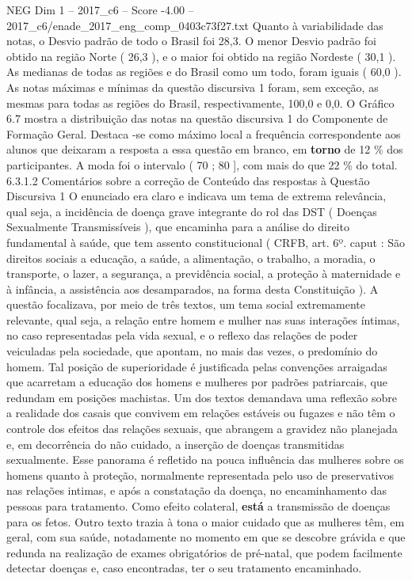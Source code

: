 \begin{textsample}{NEG Dim 1 – 2017\_c6 – Score -4.00 – 2017\_c6/enade\_2017\_eng\_comp\_0403c73f27.txt}
Quanto à variabilidade das notas, o Desvio padrão de todo o Brasil foi 28,3.
O menor Desvio padrão foi obtido na região Norte ( 26,3 ), e o maior foi obtido na região Nordeste ( 30,1 ).
As medianas de todas as regiões e do Brasil como um todo, foram iguais ( 60,0 ).
As notas máximas e mínimas da questão discursiva 1 foram, sem exceção, as mesmas para todas as regiões do Brasil, respectivamente, 100,0 e 0,0.
O Gráfico 6.7 mostra a distribuição das notas na questão discursiva 1 do Componente de Formação Geral.
Destaca -se como máximo local a frequência correspondente aos alunos que deixaram a resposta a essa questão em branco, em \textbf{torno} de 12 \% dos participantes.
A moda foi o intervalo ( 70 ; 80 ], com mais do que 22 \% do total. 6.3.1.2 Comentários sobre a correção de Conteúdo das respostas à Questão Discursiva 1 O enunciado era claro e indicava um tema de extrema relevância, qual seja, a incidência de doença grave integrante do rol das DST ( Doenças Sexualmente Transmissíveis ), que encaminha para a análise do direito fundamental à saúde, que tem assento constitucional ( CRFB, art. 6º. caput : São direitos sociais a educação, a saúde, a alimentação, o trabalho, a moradia, o transporte, o lazer, a segurança, a previdência social, a proteção à maternidade e à infância, a assistência aos desamparados, na forma desta Constituição ).
A questão focalizava, por meio de três textos, um tema social extremamente relevante, qual seja, a relação entre homem e mulher nas suas interações íntimas, no caso representadas pela vida sexual, e o reflexo das relações de poder veiculadas pela sociedade, que apontam, no mais das vezes, o predomínio do homem.
Tal posição de superioridade é justificada pelas convenções arraigadas que acarretam a educação dos homens e mulheres por padrões patriarcais, que redundam em posições machistas.
Um dos textos demandava uma reflexão sobre a realidade dos casais que convivem em relações estáveis ou fugazes e não têm o controle dos efeitos das relações sexuais, que abrangem a gravidez não planejada e, em decorrência do não cuidado, a inserção de doenças transmitidas sexualmente.
Esse panorama é refletido na pouca influência das mulheres sobre os homens quanto à proteção, normalmente representada pelo uso de preservativos nas relações intimas, e após a constatação da doença, no encaminhamento das pessoas para tratamento.
Como efeito colateral, \textbf{está} a transmissão de doenças para os fetos.
Outro texto trazia à tona o maior cuidado que as mulheres têm, em geral, com sua saúde, notadamente no momento em que se descobre grávida e que redunda na realização de exames obrigatórios de pré-natal, que podem facilmente detectar doenças e, caso encontradas, ter o seu tratamento encaminhado.

\end{textsample}
